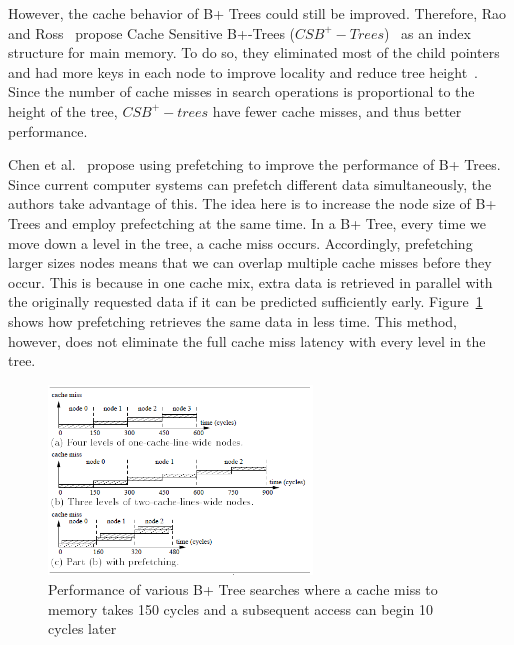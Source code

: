 \documentclass[12pt,a4paper]{article}
\begin{document}
However, the cache behavior of B+ Trees could still be improved. Therefore, Rao and Ross~\cite{rao2000making} propose Cache Sensitive B+-Trees
($CSB^{+}-Trees$)~\cite{rao2000making} as an index structure for main memory. To do so, they eliminated most of the child pointers and had more keys in each
node to improve locality and reduce tree height~\cite{luan2009prefetching}. Since the number of cache misses in search operations is proportional to the height
of the tree, $CSB^{+}-trees$ have fewer cache misses, and thus better performance.

Chen et al.~\cite{chen2001improving} propose using prefetching to improve the performance of B+ Trees. Since current computer systems can prefetch
different data simultaneously, the authors take advantage of this. The idea here is to increase the node size of B+ Trees and employ prefectching at the same
time. In a B+ Tree, every time we move down a level in the tree, a cache miss occurs. Accordingly, prefetching larger sizes nodes means that we can overlap
multiple cache misses before they occur. This is because in one cache mix, extra data is retrieved in parallel with the originally requested data if it can be
predicted sufficiently early. Figure~\ref{fig:prefetching} shows how prefetching retrieves the same data in less time. This method, however, does not
eliminate the full cache miss latency with every level in the tree.

\begin{figure}[!t]
\centering
\includegraphics[width=7cm]{figs/prefetching.png}
\caption{Performance of various B+ Tree searches where a cache miss to memory takes 150 cycles and a subsequent access can begin 10 cycles
later~\cite{chen2001improving}}
\label{fig:prefetching}
\end{figure}
\end{document}
